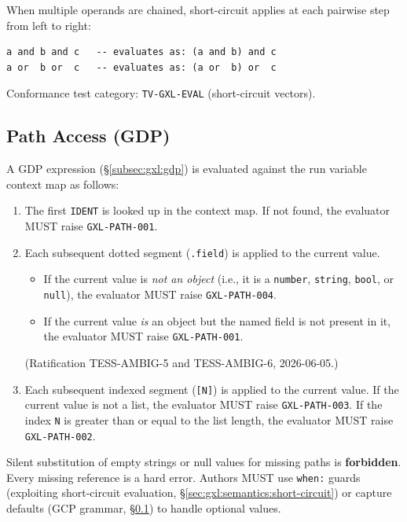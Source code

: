When multiple operands are chained, short-circuit applies at each pairwise
step from left to right:

\begin{verbatim}
a and b and c   -- evaluates as: (a and b) and c
a or  b or  c   -- evaluates as: (a or  b) or  c
\end{verbatim}

Conformance test category: \texttt{TV-GXL-EVAL} (short-circuit vectors).

\subsection{Path Access (GDP)}
\label{sec:gxl:semantics:paths}

A GDP expression (\S\ref{subsec:gxl:gdp}) is evaluated against the run
variable context map as follows:

\begin{enumerate}
  \item The first \texttt{IDENT} is looked up in the context map.
    If not found, the evaluator MUST raise \texttt{GXL-PATH-001}.
  \item Each subsequent dotted segment (\texttt{.field}) is applied to the
    current value.
    \begin{itemize}
      \item If the current value is \emph{not an object} (i.e., it is a
        \texttt{number}, \texttt{string}, \texttt{bool}, or \texttt{null}),
        the evaluator MUST raise \texttt{GXL-PATH-004}.
      \item If the current value \emph{is} an object but the named field is
        not present in it, the evaluator MUST raise \texttt{GXL-PATH-001}.
    \end{itemize}
    (Ratification TESS-AMBIG-5 and TESS-AMBIG-6, 2026-06-05.)
  \item Each subsequent indexed segment (\texttt{[N]}) is applied to the
    current value.
    If the current value is not a list, the evaluator MUST raise
    \texttt{GXL-PATH-003}.
    If the index \texttt{N} is greater than or equal to the list length,
    the evaluator MUST raise \texttt{GXL-PATH-002}.
\end{enumerate}

Silent substitution of empty strings or null values for missing paths is
\textbf{forbidden}.
Every missing reference is a hard error.
Authors MUST use \texttt{when:} guards (exploiting short-circuit evaluation,
\S\ref{sec:gxl:semantics:short-circuit}) or capture defaults
(GCP grammar, \S\ref{sec:gxl:semantics:paths}) to handle optional values.

